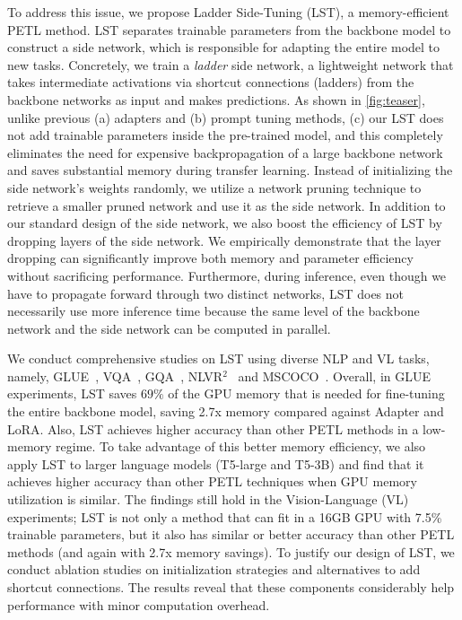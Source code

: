 To address this issue, we propose Ladder Side-Tuning (LST), a memory-efficient PETL method. LST separates trainable parameters from the backbone model to construct a side network, which is responsible for adapting the entire model to new tasks. Concretely, we train a \textit{ladder} side network, a lightweight network that takes intermediate activations via shortcut connections (ladders) from the backbone networks as input and makes predictions. As shown in \ref{fig:teaser}, unlike previous (a) adapters and (b) prompt tuning methods, (c) our LST does not add trainable parameters inside the pre-trained model, and this completely eliminates the need for expensive backpropagation of a large backbone network and saves substantial memory during transfer learning. Instead of initializing the side network's weights randomly, we utilize a network pruning technique to retrieve a smaller pruned network and use it as the side network. In addition to our standard design of the side network, we also boost the efficiency of LST by dropping layers of the side network. We empirically demonstrate that the layer dropping can significantly improve both memory and parameter efficiency without sacrificing performance. Furthermore, during inference, even though we have to propagate forward through two distinct networks, LST does not necessarily use more inference time because the same level of the backbone network and the side network can be computed in parallel.

 We conduct comprehensive studies on LST using diverse NLP and VL tasks, namely, GLUE~\cite{wang2018glue}, VQA~\cite{Goyal2017MakingTV}, GQA~\cite{hudson2019gqa}, NLVR$^2$~\cite{Suhr2019ACF} and MSCOCO~\cite{chen2015MicrosoftCC}. Overall, in GLUE experiments, LST saves $69\%$ of the GPU memory that is needed for fine-tuning the entire backbone model, saving 2.7x memory compared against Adapter and LoRA. Also, LST achieves higher accuracy than other PETL methods in a low-memory regime. To take advantage of this better memory efficiency, we also apply LST to larger language models (T5-large and T5-3B) and find that it achieves higher accuracy than other PETL techniques when GPU memory utilization is similar. The findings still hold in the Vision-Language (VL) experiments; LST is not only a method that can fit in a 16GB GPU with 7.5\% trainable parameters, but it also has similar or better accuracy than other PETL methods (and again with 2.7x memory savings). To justify our design of LST, we conduct ablation studies on initialization strategies and alternatives to add shortcut connections. The results reveal that these components considerably help performance with minor computation overhead.

